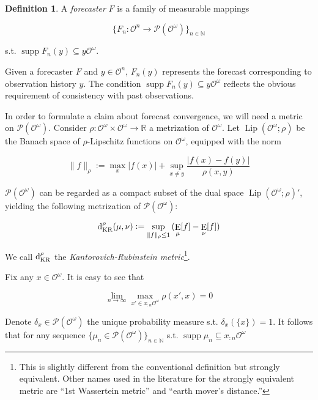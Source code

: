 \documentclass[11pt]{article}
\theoremstyle{definition}
\newtheorem{definition}{Definition}%
\theoremstyle{plain}
\newcommand{\Nats}{\mathbb{N}}
\newcommand{\Reals}{\mathbb{R}}
\newcommand{\A}[1]{\lvert #1 \rvert}
\newcommand{\N}[1]{\lVert #1 \rVert}
\newcommand{\Sq}[2]{\{#1\}_{#2 \in \Nats}}
\newcommand{\Sqn}[1]{\Sq{#1}{n}}
\DeclareMathOperator{\E}{E}
\newcommand{\PM}{\mathcal{P}}
\newcommand{\Lp}{{\operatorname{Lip}}}
\DeclareMathOperator{\Sp}{supp}
\newcommand{\DKR}{\operatorname{d}_{\textnormal{KR}}}
\newcommand{\Ob}{\mathcal{O}}
\newcommand{\OO}{\Ob^\omega}
\newcommand{\PMO}{\PM(\OO)}
\begin{document}
\begin{samepage}
\begin{definition}

A \emph{forecaster} $F$ is a family of measurable mappings

\[\Sqn{F_n: \Ob^n \rightarrow \PMO}\]

s.t. $\Sp {F_n(y)} \subseteq y\OO$.

\end{definition}
\end{samepage}

Given a forecaster $F$ and $y \in \Ob^n$, $F_n(y)$ represents the forecast corresponding to observation history $y$. The condition $\Sp {F_n(y)} \subseteq y\OO$ reflects the obvious requirement of consistency with past observations.

In order to formulate a claim about forecast convergence, we will need a metric on $\PMO$. Consider $\rho: \OO \times \OO \rightarrow \Reals$ a metrization of $\OO$. Let $\Lp(\OO;\rho)$ be the Banach space of $\rho$-Lipschitz functions on $\OO$, equipped with the norm

\begin{equation}
\N{f}_\rho:=\max_{x}{\A{f(x)}} + \sup_{x \ne y} \frac{\A{f(x)-f(y)}}{\rho(x,y)}
\end{equation}

$\PMO$ can be regarded as a compact subset of the dual space $\Lp(\OO;\rho)'$, yielding the following metrization of $\PMO$:

\begin{equation}
\DKR^\rho(\mu,\nu):=\sup_{\N{f}_\rho \leq 1}{(\E_\mu[f] - \E_\nu[f])}
\end{equation}

We call $\DKR^\rho$ the \emph{Kantorovich-Rubinstein metric}\footnote{This is slightly different from the conventional definition but strongly equivalent. Other names used in the literature for the strongly equivalent metric are \enquote{1st Wassertein metric} and \enquote{earth mover's distance.}}.

Fix any $x \in \OO$. It is easy to see that

\begin{equation}
\lim_{n \rightarrow \infty} \max_{x' \in x_{:n}\OO} \rho(x', x) = 0
\end{equation}

Denote $\delta_x \in \PMO$ the unique probability measure s.t. $\delta_x(\{x\})=1$. It follows that for any sequence $\Sqn{\mu_n \in \PMO}$ s.t. $\Sp{\mu_n} \subseteq x_{:n}\OO$
\end{document}
